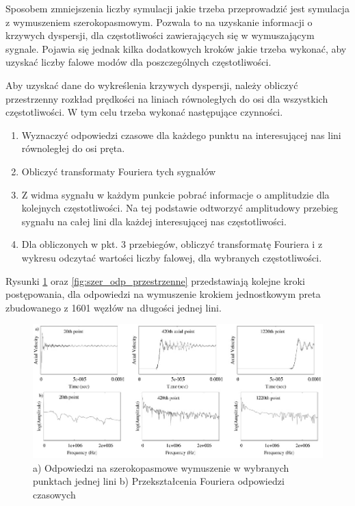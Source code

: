\vspace{3mm}

Sposobem zmniejszenia liczby symulacji jakie trzeba przeprowadzić jest symulacja z wymuszeniem szerokopasmowym. Pozwala to na uzyskanie informacji o krzywych dyspersji, dla częstotliwości zawierających się w wymuszającym sygnale. Pojawia się jednak kilka dodatkowych kroków jakie trzeba wykonać, aby uzyskać liczby falowe modów dla poszczególnych częstotliwości.

Aby uzyskać dane do wykreślenia krzywych dyspersji, należy obliczyć przestrzenny rozkład prędkości na liniach równoległych do osi dla wszystkich częstotliwości. W tym celu trzeba wykonać następujące czynności.

\begin{enumerate}
  \item Wyznaczyć odpowiedzi czasowe dla każdego punktu na interesującej nas lini równoległej do osi pręta.
  \item Obliczyć transformaty Fouriera tych sygnałów
  \item Z widma sygnału w każdym punkcie pobrać informacje o amplitudzie dla kolejnych częstotliwości. Na tej podstawie odtworzyć amplitudowy przebieg sygnału na całej lini dla każdej interesującej nas częstotliwości.
  \item Dla obliczonych w pkt. 3 przebiegów, obliczyć transformatę Fouriera i z wykresu odczytać wartości liczby falowej, dla wybranych częstotliwości.
\end{enumerate}

Rysunki \ref{fig:szer_odp_czasowe} oraz \ref{fig:szer_odp_przestrzenne} przedstawiają kolejne kroki postępowania, dla odpowiedzi na wymuszenie krokiem jednostkowym preta zbudowanego z 1601 węzłów na długości jednej lini. 

\begin{figure}[h]
\centering
\includegraphics[width=12cm]{Zdjecia/2/widmo_wymuszenia_szerokopasmowe1}
\caption{a) Odpowiedzi na szerokopasmowe wymuszenie w wybranych punktach jednej lini b) Przekształcenia Fouriera odpowiedzi czasowych \cite{bartek_valsamos}}
\label{fig:szer_odp_czasowe}
\end{figure}

